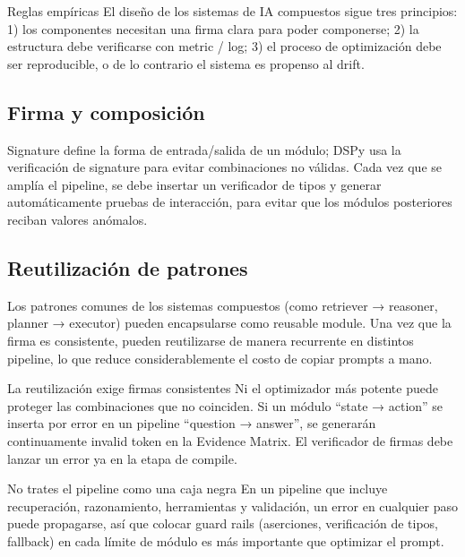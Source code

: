\documentclass[a4paper]{article}
\begin{document}
\begin{knowledgebox}{Reglas empíricas}
El diseño de los sistemas de IA compuestos sigue tres principios: 1) los componentes necesitan una firma clara para poder componerse; 2) la estructura debe verificarse con metric / log; 3) el proceso de optimización debe ser reproducible, o de lo contrario el sistema es propenso al drift.
\end{knowledgebox}

\subsection{Firma y composición}

Signature define la forma de entrada/salida de un módulo; DSPy usa la verificación de signature para evitar combinaciones no válidas. Cada vez que se amplía el pipeline, se debe insertar un verificador de tipos y generar automáticamente pruebas de interacción, para evitar que los módulos posteriores reciban valores anómalos.

\subsection{Reutilización de patrones}

Los patrones comunes de los sistemas compuestos (como retriever → reasoner, planner → executor) pueden encapsularse como reusable module. Una vez que la firma es consistente, pueden reutilizarse de manera recurrente en distintos pipeline, lo que reduce considerablemente el costo de copiar prompts a mano.

\begin{knowledgebox}{La reutilización exige firmas consistentes}
Ni el optimizador más potente puede proteger las combinaciones que no coinciden. Si un módulo ``state → action'' se inserta por error en un pipeline ``question → answer'', se generarán continuamente invalid token en la Evidence Matrix. El verificador de firmas debe lanzar un error ya en la etapa de compile.
\end{knowledgebox}

\begin{warningbox}{No trates el pipeline como una caja negra}
En un pipeline que incluye recuperación, razonamiento, herramientas y validación, un error en cualquier paso puede propagarse, así que colocar guard rails (aserciones, verificación de tipos, fallback) en cada límite de módulo es más importante que optimizar el prompt.
\end{warningbox}
\end{document}
